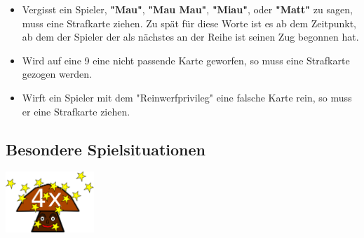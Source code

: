 \documentclass{article}
\begin{document}
\begin{itemize}
\begin{itemize}
\item Vergisst ein Spieler, \textbf{"Mau"}, \textbf{"Mau Mau"}, \textbf{"Miau"}, oder \textbf{"Matt"} zu sagen, muss eine Strafkarte ziehen. Zu spät für diese Worte ist es ab dem Zeitpunkt, ab dem der Spieler der als nächstes an der Reihe ist seinen Zug begonnen hat.

\item Wird auf eine 9 eine nicht passende Karte geworfen, so muss eine Strafkarte gezogen werden.

\item Wirft ein Spieler mit dem "Reinwerfprivileg" eine falsche Karte rein, so muss er eine Strafkarte ziehen.
\end{itemize}         
\end{itemize}
          
\subsection*{Besondere Spielsituationen}
\includegraphics[width=0.25\textwidth]{photos/Pilz.png}
\end{document}
